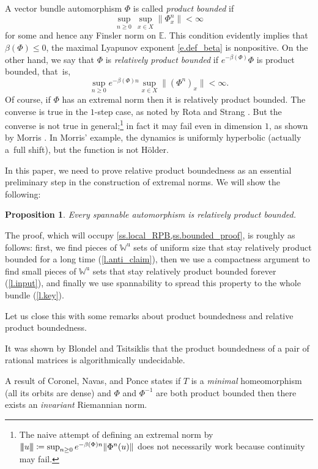 \documentclass[JEP,XML,SOM,Unicode]{cedram}
\def\vcentcolon{\mathrel{\mathop\ordinarycolon}}
\providecommand\ordinarycolon{:}
\providecommand*\coloneqq{\vcentcolon\mathrel{\mkern-1.2mu}=}
\theoremstyle{plain}
\newtheorem{proposition}[theorem]{Proposition}
\theoremstyle{definition}
\newcommand{\tribar}[1]{\mathopen{| {\kern -1.5pt} | {\kern -1.5pt} |} {#1}
\mathclose{| {\kern -1.5pt} | {\kern -1.5pt} |}}
\newcommand{\EE}{\mathbb{E}}
\newcommand{\WW}{\mathbb{W}}
\newcommand{\uu}{\mathrm{u}}
\begin{document}
A vector bundle automorphism $\Phi$ is called \emph{product bounded} if
\[
\sup_{n \ge 0} \, \sup_{x\in X} \|\Phi^n_x\| < \infty
\]
for some and hence any Finsler norm on $\EE$.
This condition evidently implies that $\beta(\Phi)\le 0$, \ie the maximal Lyapunov exponent \eqref{e.def_beta} is nonpositive.
On the other hand, we say that $\Phi$ is \emph{relatively product bounded} if $e^{-\beta(\Phi)} \Phi$ is product bounded, that~is,
\[
\sup_{n \ge 0} e^{-\beta(\Phi) n} \sup_{x\in X} \|(\Phi^n)_x\| < \infty.
\]
Of course, if $\Phi$ has an extremal norm then it is relatively product bounded.
The converse is true in the $1$-step case, as noted by Rota and Strang \cite{RS}.
But the converse is not true in general;\footnote{The naive attempt of defining an extremal norm by $\tribar{u} \coloneqq \sup_{n\ge 0} e^{-\beta(\Phi) n}\|\Phi^n(u)\|$ does not necessarily work because continuity may fail.} in fact it may fail even in dimension $1$, as shown by Morris \cite[Prop.\,2]{Morris_sufficient}.
In Morris' example, the dynamics is uniformly hyperbolic (actually a~full shift), but the function is not Hölder.

In this paper, we need to prove relative product boundedness as an essential preliminary step in the construction of extremal norms.
We will show the following:

\begin{proposition}\label{p.bounded}
Every spannable automorphism is relatively product bounded.
\end{proposition}

The proof, which will occupy \cref{ss.local_RPB,ss.bounded_proof},
is roughly as follows:
first, we find pieces of $\WW^\uu$ sets of uniform size that stay relatively product bounded for a long time (\cref{l.anti_claim}), then we use a compactness argument to find small pieces of $\WW^\uu$ sets that stay relatively product bounded forever (\cref{l.input}), and finally we use spannability to spread this property to the whole bundle (\cref{l.key}).

Let us close this  with some remarks about product boundedness and relative product boundedness.

It was shown by Blondel and Tsitsiklis \cite{BT} that the product boundedness of a pair of rational matrices is algorithmically undecidable.

A result of Coronel, Navas, and Ponce \cite{CNP} states if $T$ is a \emph{minimal} homeomorphism (\ie all its orbits are dense) and $\Phi$ and $\Phi^{-1}$ are both product bounded then there exists an \emph{invariant} Riemannian norm.
\end{document}

